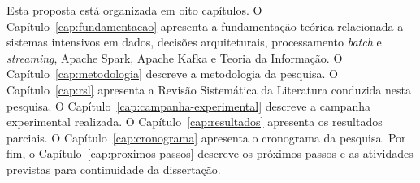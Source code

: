 Esta proposta está organizada em oito capítulos. O Capítulo~\ref{cap:fundamentacao} apresenta a fundamentação teórica relacionada a sistemas intensivos em dados, decisões arquiteturais, processamento \textit{batch} e \textit{streaming}, Apache Spark, Apache Kafka e Teoria da Informação. O Capítulo~\ref{cap:metodologia} descreve a metodologia da pesquisa. O Capítulo~\ref{cap:rsl} apresenta a Revisão Sistemática da Literatura conduzida nesta pesquisa. O Capítulo~\ref{cap:campanha-experimental} descreve a campanha experimental realizada. O Capítulo~\ref{cap:resultados} apresenta os resultados parciais. O Capítulo~\ref{cap:cronograma} apresenta o cronograma da pesquisa. Por fim, o Capítulo~\ref{cap:proximos-passos} descreve os próximos passos e as atividades previstas para continuidade da dissertação.
